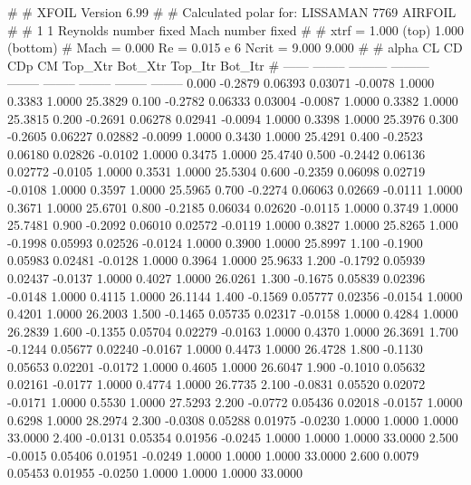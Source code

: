 #  
#       XFOIL         Version 6.99
#  
# Calculated polar for: LISSAMAN 7769 AIRFOIL                           
#  
# 1 1 Reynolds number fixed          Mach number fixed         
#  
# xtrf =   1.000 (top)        1.000 (bottom)  
# Mach =   0.000     Re =     0.015 e 6     Ncrit =   9.000  9.000
#  
#   alpha    CL        CD       CDp       CM     Top_Xtr  Bot_Xtr  Top_Itr  Bot_Itr
#  ------ -------- --------- --------- -------- -------- -------- -------- --------
   0.000  -0.2879   0.06393   0.03071  -0.0078   1.0000   0.3383   1.0000  25.3829
   0.100  -0.2782   0.06333   0.03004  -0.0087   1.0000   0.3382   1.0000  25.3815
   0.200  -0.2691   0.06278   0.02941  -0.0094   1.0000   0.3398   1.0000  25.3976
   0.300  -0.2605   0.06227   0.02882  -0.0099   1.0000   0.3430   1.0000  25.4291
   0.400  -0.2523   0.06180   0.02826  -0.0102   1.0000   0.3475   1.0000  25.4740
   0.500  -0.2442   0.06136   0.02772  -0.0105   1.0000   0.3531   1.0000  25.5304
   0.600  -0.2359   0.06098   0.02719  -0.0108   1.0000   0.3597   1.0000  25.5965
   0.700  -0.2274   0.06063   0.02669  -0.0111   1.0000   0.3671   1.0000  25.6701
   0.800  -0.2185   0.06034   0.02620  -0.0115   1.0000   0.3749   1.0000  25.7481
   0.900  -0.2092   0.06010   0.02572  -0.0119   1.0000   0.3827   1.0000  25.8265
   1.000  -0.1998   0.05993   0.02526  -0.0124   1.0000   0.3900   1.0000  25.8997
   1.100  -0.1900   0.05983   0.02481  -0.0128   1.0000   0.3964   1.0000  25.9633
   1.200  -0.1792   0.05939   0.02437  -0.0137   1.0000   0.4027   1.0000  26.0261
   1.300  -0.1675   0.05839   0.02396  -0.0148   1.0000   0.4115   1.0000  26.1144
   1.400  -0.1569   0.05777   0.02356  -0.0154   1.0000   0.4201   1.0000  26.2003
   1.500  -0.1465   0.05735   0.02317  -0.0158   1.0000   0.4284   1.0000  26.2839
   1.600  -0.1355   0.05704   0.02279  -0.0163   1.0000   0.4370   1.0000  26.3691
   1.700  -0.1244   0.05677   0.02240  -0.0167   1.0000   0.4473   1.0000  26.4728
   1.800  -0.1130   0.05653   0.02201  -0.0172   1.0000   0.4605   1.0000  26.6047
   1.900  -0.1010   0.05632   0.02161  -0.0177   1.0000   0.4774   1.0000  26.7735
   2.100  -0.0831   0.05520   0.02072  -0.0171   1.0000   0.5530   1.0000  27.5293
   2.200  -0.0772   0.05436   0.02018  -0.0157   1.0000   0.6298   1.0000  28.2974
   2.300  -0.0308   0.05288   0.01975  -0.0230   1.0000   1.0000   1.0000  33.0000
   2.400  -0.0131   0.05354   0.01956  -0.0245   1.0000   1.0000   1.0000  33.0000
   2.500  -0.0015   0.05406   0.01951  -0.0249   1.0000   1.0000   1.0000  33.0000
   2.600   0.0079   0.05453   0.01955  -0.0250   1.0000   1.0000   1.0000  33.0000
